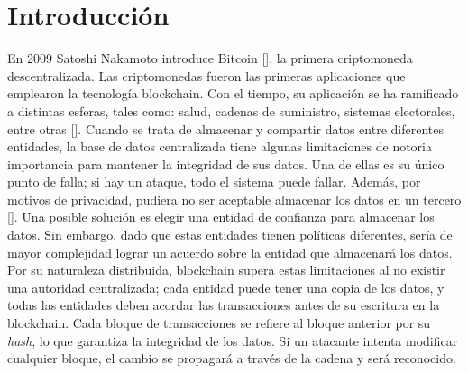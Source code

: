 \chapter*{Introducción}\label{chapter:introduction}


En 2009 Satoshi Nakamoto introduce Bitcoin [\cite{nakamoto2008bitcoin}], la primera criptomoneda descentralizada. Las criptomonedas fueron las primeras aplicaciones que emplearon la tecnolog\'ia blockchain. Con el tiempo, su aplicaci\'on se ha ramificado a distintas esferas, tales como: salud, cadenas de suministro, sistemas electorales, entre otras [\cite{tama2017critical}]. Cuando se trata de almacenar y compartir datos entre diferentes entidades, la base de datos centralizada tiene algunas limitaciones de notoria importancia para mantener la integridad de sus datos. Una de ellas es su \'unico punto de falla; si hay un ataque, todo el sistema puede fallar. Adem\'as, por motivos de privacidad, pudiera no ser aceptable almacenar los datos en un tercero [\cite{xu2017taxonomy}]. Una posible soluci\'on es elegir una entidad de confianza para almacenar los datos. Sin embargo, dado que estas entidades tienen pol\'iticas diferentes, ser\'ia de mayor complejidad lograr un acuerdo sobre la entidad que almacenar\'a los datos. Por su naturaleza distribuida, blockchain supera estas limitaciones al no existir una autoridad centralizada; cada entidad puede tener una copia de los datos, y todas las entidades deben acordar las transacciones antes de su escritura en la blockchain. Cada bloque de transacciones se refiere al bloque anterior por su \emph{hash}, lo que garantiza la integridad de los datos. Si un atacante intenta modificar cualquier bloque, el cambio se propagar\'a a trav\'es de la cadena y ser\'a reconocido.

